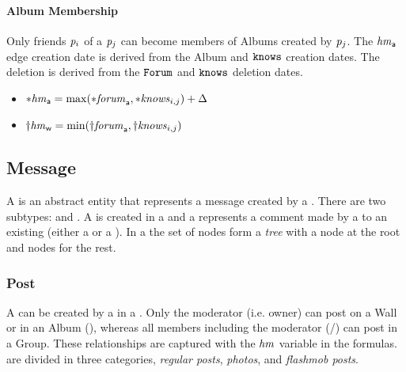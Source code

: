 \paragraph{Album Membership}
Only friends $\mathit{p}_i$ of a \tPerson $\mathit{p}_j$ can become members of Albums created by $\mathit{p}_j$. The \tHasMember $\mathit{hm}_{\mathsf{a}}$ edge creation date is derived from the Album and $\texttt{knows}$ creation dates. The deletion is derived from the $\texttt{Forum}$ and $\texttt{knows}$ deletion dates.
\begin{itemize}
    \item ${\ast}\mathit{\mathit{hm}}_\textsf{a} = \max ( {\ast}\mathit{\mathit{forum}}_\textsf{a}, {\ast}\mathit{\mathit{knows}}_{i,j} ) + \Delta $ %
    \item ${\dagger}\mathit{\mathit{hm}}_{\mathsf{w}} = \min ( {\dagger}\mathit{\mathit{forum}}_\textsf{a}, {\dagger}\mathit{\mathit{knows}}_{i,j} ) $ %
\end{itemize}

\subsection{Message}
\label{sec:message}

A \tMessage is an abstract entity that represents a message created by a \tPerson.
There are two \tMessage subtypes: \tPost and \tComment.
A \tPost is created in a \tForum and a \tComment represents a comment made by a \tPerson to an existing \tMessage (either a \tPost or a \tComment).
In a \tForum the set of \tMessage nodes form a \emph{tree} with a \tPost node at the root and \tComment nodes for the rest.

\subsubsection{Post}

A \tPost can be created by a \tPerson in a \tForum.
Only the moderator (i.e. owner) can post on a Wall or in an Album (\tHasModerator),
whereas all members including the moderator (\tHasMember/\tHasModerator) can post in a Group.
These relationships are captured with the $\mathit{hm}$ variable in the formulas.
\tPosts are divided in three categories, \emph{regular posts}, \emph{photos}, and \emph{flashmob posts}.

